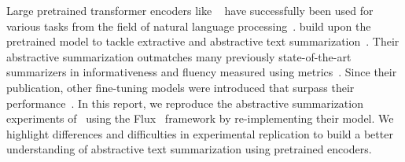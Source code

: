 Large pretrained transformer encoders like \Bert~\cite{DevlinCLT2019} have successfully been used for various tasks from the field of natural language processing~\cite{LiuL2019}. \citeauthor{LiuL2019} build upon the pretrained \Bert model to tackle extractive and abstractive text summarization~\cite{LiuL2019}. Their abstractive summarization outmatches many previously state-of-the-art summarizers in informativeness and fluency measured using \Rouge metrics~\cite{LiuL2019,Lin2004}.
Since their publication, other fine-tuning models were introduced that surpass their performance~\cite{AghajanyanSGGZG2020,SavelievaAR2020}.
In this report, we reproduce the abstractive summarization experiments of~\citeauthor{LiuL2019} using the Flux~\cite{InnesSFGRJKPS2018} framework by re-implementing their \BertSumAbs model.
We highlight differences and difficulties in experimental replication to build a better understanding of abstractive text summarization using pretrained encoders. 
